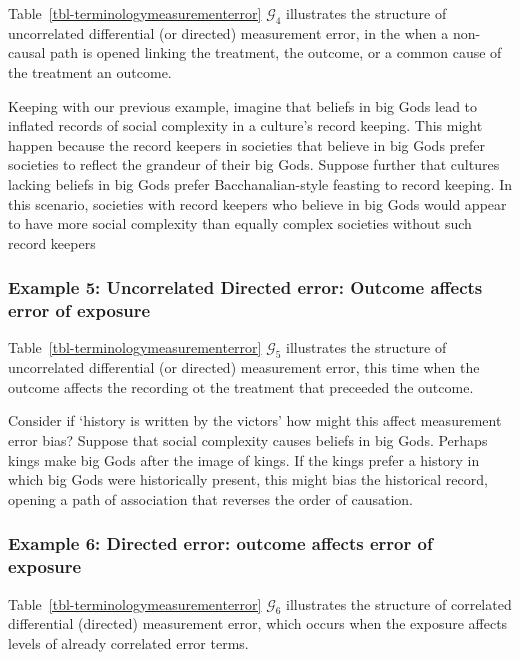 \documentclass[
  single column]{article}
\begin{document}
Table~\ref{tbl-terminologymeasurementerror} \(\mathcal{G}_4\)
illustrates the structure of uncorrelated differential (or directed)
measurement error, in the when a non-causal path is opened linking the
treatment, the outcome, or a common cause of the treatment an outcome.

Keeping with our previous example, imagine that beliefs in big Gods lead
to inflated records of social complexity in a culture's record keeping.
This might happen because the record keepers in societies that believe
in big Gods prefer societies to reflect the grandeur of their big Gods.
Suppose further that cultures lacking beliefs in big Gods prefer
Bacchanalian-style feasting to record keeping. In this scenario,
societies with record keepers who believe in big Gods would appear to
have more social complexity than equally complex societies without such
record keepers

\subsubsection{Example 5: Uncorrelated Directed error: Outcome affects
error of
exposure}\label{example-5-uncorrelated-directed-error-outcome-affects-error-of-exposure}

Table~\ref{tbl-terminologymeasurementerror} \(\mathcal{G}_5\)
illustrates the structure of uncorrelated differential (or directed)
measurement error, this time when the outcome affects the recording ot
the treatment that preceeded the outcome.

Consider if `history is written by the victors' how might this affect
measurement error bias? Suppose that social complexity causes beliefs in
big Gods. Perhaps kings make big Gods after the image of kings. If the
kings prefer a history in which big Gods were historically present, this
might bias the historical record, opening a path of association that
reverses the order of causation.

\subsubsection{Example 6: Directed error: outcome affects error of
exposure}\label{example-6-directed-error-outcome-affects-error-of-exposure}

Table~\ref{tbl-terminologymeasurementerror} \(\mathcal{G}_6\)
illustrates the structure of correlated differential (directed)
measurement error, which occurs when the exposure affects levels of
already correlated error terms.
\end{document}
